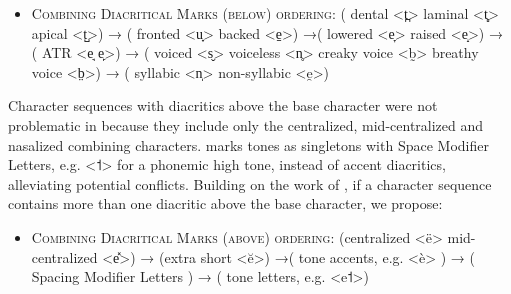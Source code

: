 \begin{itemize}
	\itemsep1pt\parskip0pt \item \textsc{Combining Diacritical
	Marks (below) ordering:} ( dental <t̪> \textbar{} laminal <t̻>
	\textbar{} apical <t̺>) → ( fronted <u̟> \textbar{} backed <e̠>) →(
	lowered <e̞> \textbar{} raised <e̝>) → ( ATR <e̘ e̙>) → ( voiced <s̬>
	\textbar{} voiceless <n̥> \textbar{} creaky voice <b̰> \textbar{}
	breathy voice <b̤>) → ( syllabic <n̩> \textbar{} non-syllabic <e̯>)
\end{itemize}

Character sequences with diacritics above the base character were not
problematic in \citet{Moran2012} because they include only the centralized,
mid-centralized and nasalized combining characters. \citet{Moran2012} marks
tones as singletons with Space Modifier Letters, e.g. \textless{}˦\textgreater{}
for a phonemic high tone, instead of accent diacritics, alleviating potential
conflicts. Building on the work of \citet{Moran2012}, if a character sequence
contains more than one diacritic above the base character, we propose:

\begin{itemize}
	\itemsep1pt\parskip0pt \item \textsc{Combining Diacritical
	Marks (above) ordering:} (centralized <ë> \textbar{} mid-centralized
	<e̽>) → (extra short <ĕ>) →( tone accents, e.g. <è> ) → ( Spacing
	Modifier Letters ) → ( tone letters, e.g. <e˦>)
\end{itemize}
